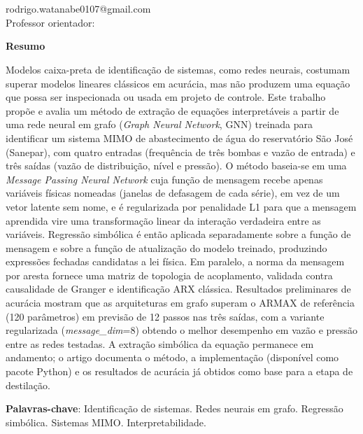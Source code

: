 \documentclass[
	article,		%
	12pt,			%
	oneside,
	a4paper,
	brazil
]{abntex2}
\begin{document}
\thispagestyle{primeirapagina}

\begin{center}
	{\large\bfseries \imprimirtitulo}\\[12pt]

	\imprimirautor\\
	\small rodrigo.watanabe0107@gmail.com\\[10pt] %

	\normalsize Professor orientador: \imprimirorientador\\[10pt]

	\imprimirinstituicao
\end{center}

\vspace{12pt}

\begin{center}
	\bfseries Resumo
\end{center}

\begin{SingleSpace}
\noindent Modelos caixa-preta de identificação de sistemas, como redes
neurais, costumam superar modelos lineares clássicos em acurácia, mas não
produzem uma equação que possa ser inspecionada ou usada em projeto de
controle. Este trabalho propõe e avalia um método de extração de equações
interpretáveis a partir de uma rede neural em grafo (\textit{Graph Neural
Network}, GNN) treinada para identificar um sistema MIMO de abastecimento
de água do reservatório São José (Sanepar), com quatro entradas (frequência
de três bombas e vazão de entrada) e três saídas (vazão de distribuição,
nível e pressão). O método baseia-se em uma \textit{Message Passing Neural
Network} cuja função de mensagem recebe apenas variáveis físicas nomeadas
(janelas de defasagem de cada série), em vez de um vetor latente sem nome,
e é regularizada por penalidade L1 para que a mensagem aprendida vire uma
transformação linear da interação verdadeira entre as variáveis.
Regressão simbólica é então aplicada separadamente sobre a função de
mensagem e sobre a função de atualização do modelo treinado, produzindo
expressões fechadas candidatas a lei física. Em paralelo, a norma da
mensagem por aresta fornece uma matriz de topologia de acoplamento, validada
contra causalidade de Granger e identificação ARX clássica. Resultados
preliminares de acurácia mostram que as arquiteturas em grafo superam o
ARMAX de referência (120 parâmetros) em previsão de 12 passos nas três
saídas, com a variante regularizada (\textit{message\_dim}=8) obtendo o
melhor desempenho em vazão e pressão entre as redes testadas. A extração
simbólica da equação permanece em andamento; o artigo documenta o método,
a implementação (disponível como pacote Python) e os resultados de
acurácia já obtidos como base para a etapa de destilação.

\vspace{6pt}
\noindent\textbf{Palavras-chave}: Identificação de sistemas. Redes neurais
em grafo. Regressão simbólica. Sistemas MIMO. Interpretabilidade.
\end{SingleSpace}
\end{document}
